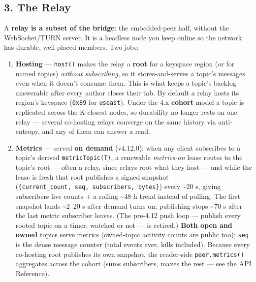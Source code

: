 \documentclass[
  nobib]{tufte-handout}
\providecommand{\tightlist}{%
  \setlength{\itemsep}{0pt}\setlength{\parskip}{0pt}}
\renewcommand{\subsubsection}[1]{\medskip\par\noindent{\normalsize\bfseries #1}\par\nobreak\smallskip}
\begin{document}
\subsection{3. The Relay}\label{the-relay}

\subsubsection{What it is}\label{what-it-is-1}

A \textbf{relay is a subset of the bridge}: the embedded-peer half,
without the WebSocket/TURN server. It is a headless node you keep online
so the network has durable, well-placed members. Two jobs:

\begin{enumerate}
\def\labelenumi{\arabic{enumi}.}
\tightlist
\item
  \textbf{Hosting} --- \texttt{host()} makes the relay a \textbf{root}
  for a keyspace region (or for named topics) \emph{without
  subscribing}, so it stores-and-serves a topic's messages even when it
  doesn't consume them. This is what keeps a topic's backlog answerable
  after every author closes their tab. By default a relay hosts its
  region's keyspace (\texttt{0x89} for \texttt{useast}). Under the 4.x
  \textbf{cohort} model a topic is replicated across the K-closest
  nodes, so durability no longer rests on one relay --- several
  co-hosting relays converge on the same history via anti-entropy, and
  any of them can answer a read.
\item
  \textbf{Metrics} --- served \textbf{on demand} (v4.12.0): when any
  client subscribes to a topic's derived \texttt{metricTopic(T)}, a
  renewable \emph{metrics-on} lease routes to the topic's root --- often
  a relay, since relays root what they host --- and while the lease is
  fresh that root publishes a signed snapshot
  (\texttt{\{current\_count,\ seq,\ subscribers,\ bytes\}}) every
  \textasciitilde20 s, giving subscribers live counts + a rolling
  \textasciitilde48 h trend instead of polling. The first snapshot lands
  \textasciitilde2--20 s after demand turns on; publishing stops
  \textasciitilde70 s after the last metric subscriber leaves. (The
  pre-4.12 push loop --- publish every rooted topic on a timer, watched
  or not --- is retired.) \textbf{Both open and owned} topics serve
  metrics (owned-topic activity counts are public too); \texttt{seq} is
  the dense message counter (total events ever, kills included). Because
  every co-hosting root publishes its own snapshot, the reader-side
  \texttt{peer.metrics()} aggregates across the cohort (sums
  subscribers, maxes the rest --- see the API Reference).
\end{enumerate}
\end{document}
